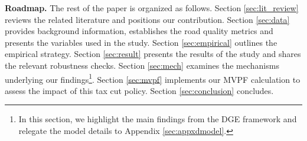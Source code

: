  


{\bf Roadmap.} The rest of the paper is organized as follows. Section \ref{sec:lit_review} reviews the related literature and positions our contribution. Section \ref{sec:data} provides background information, establishes the road quality metrics and presents the variables used in the study. Section \ref{sec:empirical} outlines the empirical strategy. Section \ref{sec:result} presents the results of the study and shares the relevant robustness checks. Section \ref{sec:mech} examines the mechanisms underlying our findings\footnote{In this section, we highlight the main findings from the DGE framework and relegate the model details to Appendix \ref{sec:appxdmodel}.}. Section \ref{sec:mvpf} implements our MVPF calculation to assess the impact of this tax cut policy. Section \ref{sec:conclusion} concludes. 
